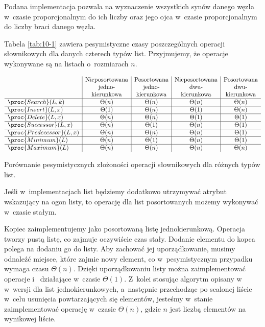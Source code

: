 Podana implementacja pozwala na wyznaczenie wszystkich synów danego węzła w~czasie proporcjonalnym do ich liczby oraz jego ojca w~czasie proporcjonalnym do liczby braci danego węzła.

\problems

Tabela \ref{tab:10-1} zawiera pesymistyczne czasy poszczególnych operacji słownikowych dla danych czterech typów list.
Przyjmujemy, że operacje wykonywane są na listach o~rozmiarach $n$.

\begin{table}[ht]
	\begin{center}
		\[
			\begin{array}{l|c|c|c|c}
				& \text{Nieposortowana} & \text{Posortowana} & \text{Nieposortowana} & \text{Posortowana} \\
				& \text{jedno-} & \text{jedno-} & \text{dwu-} & \text{dwu-} \\
				& \text{kierunkowa} & \text{kierunkowa} & \text{kierunkowa} & \text{kierunkowa} \\
				\hline
				\proc{Search}(L,k) & \Theta(n) & \Theta(n) & \Theta(n) & \Theta(n) \\
				\hline
				\proc{Insert}(L,x) & \Theta(1) & \Theta(n) & \Theta(1) & \Theta(n) \\
				\hline
				\proc{Delete}(L,x) & \Theta(n) & \Theta(n) & \Theta(1) & \Theta(1) \\
				\hline
				\proc{Successor}(L,x) & \Theta(n) & \Theta(1) & \Theta(n) & \Theta(1) \\
				\hline
				\proc{Predecessor}(L,x) & \Theta(n) & \Theta(n) & \Theta(n) & \Theta(1) \\
				\hline
				\proc{Minimum}(L) & \Theta(n) & \Theta(1) & \Theta(n) & \Theta(1) \\
				\hline
				\proc{Maximum}(L) & \Theta(n) & \Theta(n) & \Theta(n) & \Theta(n)
			\end{array}
		\]
	\end{center}
	\caption{Porównanie pesymistycznych złożoności operacji słownikowych dla różnych typów list.} \label{tab:10-1}
\end{table}
Jeśli w~implementacjach list będziemy dodatkowo utrzymywać atrybut  wskazujący na ogon listy, to operację  dla list posortowanych możemy wykonywać w~czasie stałym.


\subproblem %
Kopiec zaimplementujemy jako posortowaną listę jednokierunkową.
Operacja  tworzy pustą listę, co zajmuje oczywiście czas stały.
Dodanie elementu do kopca polega na dodaniu go do listy.
Aby zachować jej uporządkowanie, musimy odnaleźć miejsce, które zajmie nowy element, co w~pesymistycznym przypadku wymaga czasu $\Theta(n)$.
Dzięki uporządkowaniu listy można zaimplementować operacje  i~ działające w~czasie $\Theta(1)$.
Z~kolei stosując algorytm opisany w~ w~wersji dla list jednokierunkowych, a~następnie przechodząc po scalonej liście w~celu usunięcia powtarzających się elementów, jesteśmy w~stanie zaimplementować operację  w~czasie $\Theta(n)$, gdzie $n$ jest liczbą elementów na wynikowej liście.

